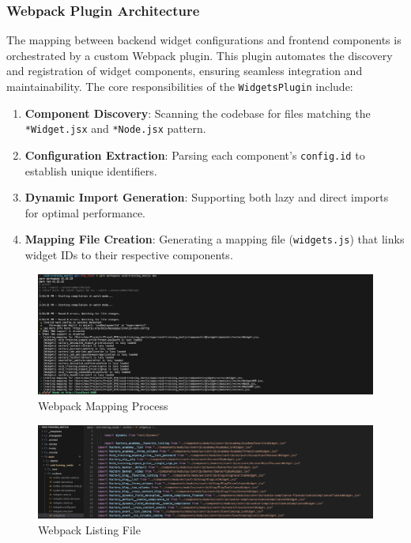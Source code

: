 \subsubsection{Webpack Plugin Architecture}
\noindent
The mapping between backend widget configurations and frontend components is orchestrated by a custom Webpack plugin. This plugin automates the discovery and registration of widget components, ensuring seamless integration and maintainability. The core responsibilities of the \texttt{WidgetsPlugin} include:

\begin{enumerate}
    \item \textbf{Component Discovery}: Scanning the codebase for files matching the \texttt{*Widget.jsx} and \texttt{*Node.jsx} pattern.
    \item \textbf{Configuration Extraction}: Parsing each component's \texttt{config.id} to establish unique identifiers.
    \item \textbf{Dynamic Import Generation}: Supporting both lazy and direct imports for optimal performance.
    \item \textbf{Mapping File Creation}: Generating a mapping file (\texttt{widgets.js}) that links widget IDs to their respective components.
\end{enumerate}


\begin{figure}[H]
    \centering
    \includegraphics[width=\textwidth]{images/webpack_mapping.png}
    \caption{Webpack Mapping Process}
    \label{fig:webpack_mapping}
\end{figure}

\begin{figure}[H]
    \centering
    \includegraphics[width=\textwidth]{images/webpack_listing.png}
    \caption{Webpack Listing File}
    \label{fig:webpack_listing}
\end{figure}

